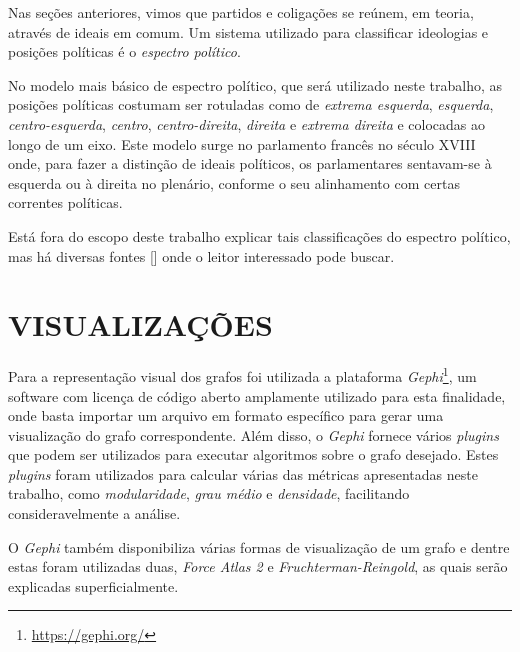 Nas seções anteriores, vimos que partidos e coligações se reúnem, em teoria, através de ideais em comum. Um sistema utilizado para classificar ideologias e posições políticas é o \emph{espectro político}.

No modelo mais básico de espectro político, que será utilizado neste trabalho, as posições políticas costumam ser rotuladas como de \emph{extrema esquerda}, \emph{esquerda}, \emph{centro-esquerda}, \emph{centro}, \emph{centro-direita}, \emph{direita} e \emph{extrema direita} e colocadas ao longo de um eixo. Este modelo surge no parlamento francês no século XVIII onde, para fazer a distinção de ideais políticos, os parlamentares sentavam-se à esquerda ou à direita no plenário, conforme o seu alinhamento com certas correntes políticas.


Está fora do escopo deste trabalho explicar tais classificações do espectro político, mas há diversas fontes [] onde o leitor interessado pode buscar.


\section{\texorpdfstring{\MakeUppercase{Visualizações}}{}}
\label{conceitos__visualizacoes}

Para a representação visual dos grafos foi utilizada a plataforma \emph{Gephi}\footnote{\url{https://gephi.org/}}, um software com licença de código aberto amplamente utilizado para esta finalidade, onde basta importar um arquivo em formato específico para gerar uma visualização do grafo correspondente. Além disso, o \emph{Gephi} fornece vários \emph{plugins} que podem ser utilizados para executar algoritmos sobre o grafo desejado. Estes \emph{plugins} foram utilizados para calcular várias das métricas apresentadas neste trabalho, como \emph{modularidade}, \emph{grau médio} e \emph{densidade}, facilitando consideravelmente a análise.

O \emph{Gephi} também disponibiliza várias formas de visualização de um grafo e dentre estas foram utilizadas duas, \emph{Force Atlas 2} e \emph{Fruchterman-Reingold}, as quais serão explicadas superficialmente.

